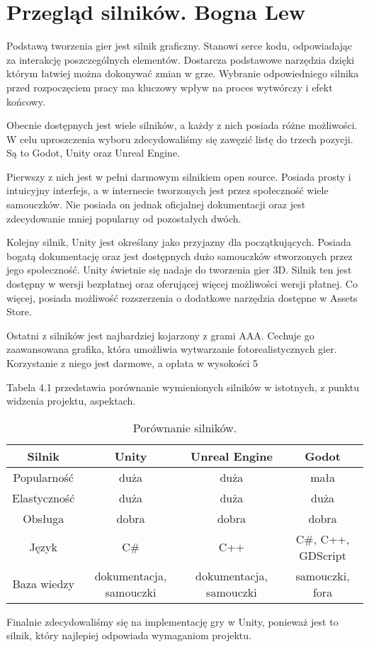 \section{Przegląd silników. Bogna Lew}
Podstawą tworzenia gier jest silnik graficzny. Stanowi serce kodu, odpowiadając za interakcję poszczególnych elementów. Dostarcza podstawowe narzędzia dzięki którym łatwiej można dokonywać zmian w grze. Wybranie odpowiedniego silnika przed rozpoczęciem pracy ma kluczowy wpływ na proces wytwórczy i efekt końcowy.

Obecnie dostępnych jest wiele silników, a każdy z nich posiada różne możliwości. W celu uproszczenia wyboru zdecydowaliśmy się zawęzić listę do trzech pozycji. Są to Godot, Unity oraz Unreal Engine.

Pierwszy z nich jest w pełni darmowym silnikiem open source. Posiada prosty i intuicyjny interfejs, a w internecie tworzonych jest przez społeczność wiele samouczków. Nie posiada on jednak oficjalnej dokumentacji oraz jest zdecydowanie mniej popularny od pozostałych dwóch.

Kolejny silnik, Unity jest określany jako przyjazny dla początkujących. Posiada bogatą dokumentację oraz jest dostępnych dużo samouczków stworzonych przez jego społeczność. Unity świetnie się nadaje do tworzenia gier 3D. Silnik ten jest dostępny w wersji bezpłatnej oraz oferującej więcej możliwości wersji płatnej. Co więcej, posiada możliwość rozszerzenia o dodatkowe narzędzia dostępne w Assets Store.

Ostatni z silników jest najbardziej kojarzony z grami AAA. Cechuje go zaawansowana grafika, która umożliwia wytwarzanie fotorealistycznych gier. Korzystanie z niego jest darmowe, a opłata w wysokości 5%

Tabela 4.1 przedstawia porównanie wymienionych silników w istotnych, z punktu widzenia projektu, aspektach.

\begin{table}[h]
\begin{center}
\begin{tabular}{ |c||c|c|c| }
 \hline
 Silnik & Unity & Unreal Engine & Godot \\
 \hline \hline
 Popularność & duża & duża & mała \\
 \hline
 Elastyczność & duża & duża & duża \\
 \hline
 Obsługa & dobra & dobra & dobra \\
 \hline
 Język & C\# & C++ & C\#, C++, GDScript \\
 \hline
 Baza wiedzy & dokumentacja,  samouczki & dokumentacja, samouczki & samouczki, fora \\
 \hline
\end{tabular}
\end{center}
\caption{Porównanie silników.}
\end{table}

Finalnie zdecydowaliśmy się na implementację gry w Unity, ponieważ jest to silnik, który najlepiej odpowiada wymaganiom projektu.
